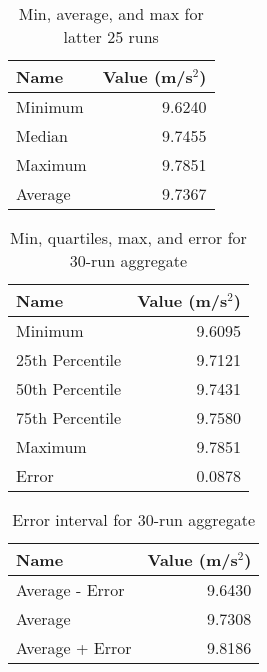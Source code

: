 \begin{table}[ht]
    \centering
    \begin{tabular}{|l|r|}
        \hline
        \textbf{Name} & \textbf{Value} (m/s$^{2}$) \\
        \hline
        Minimum & 9.6240 \\
        Median & 9.7455 \\
        Maximum & 9.7851 \\
        Average & 9.7367 \\
        \hline
    \end{tabular}
    \caption{Min, average, and max for latter 25 runs}
    \label{table:01.m.a.m.25}
\end{table}
\begin{table}[ht]
    \centering
    \begin{tabular}{|l|r|}
        \hline
        \textbf{Name} & \textbf{Value} (m/s$^{2}$) \\
        \hline
        Minimum & 9.6095 \\
        25th Percentile & 9.7121 \\
        50th Percentile & 9.7431 \\
        75th Percentile & 9.7580 \\
        Maximum & 9.7851 \\
        Error & 0.0878 \\
        \hline
    \end{tabular}
    \caption{Min, quartiles, max, and error for 30-run aggregate}
    \label{table:01.m.a.m.30}
\end{table}
\begin{table}[ht]
    \centering
    \begin{tabular}{|l|r|}
        \hline
        \textbf{Name} & \textbf{Value} (m/s$^{2}$) \\
        \hline
        Average - Error & 9.6430 \\
        Average & 9.7308 \\
        Average + Error & 9.8186 \\
        \hline
    \end{tabular}
    \caption{Error interval for 30-run aggregate}
    \label{table:01.error}
\end{table}

